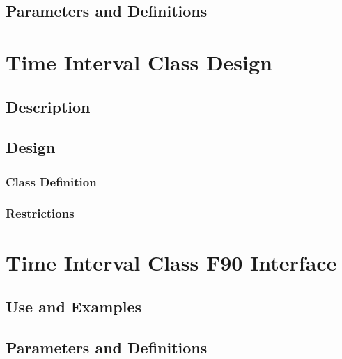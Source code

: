 \documentclass[]{article}
\begin{document}
\subsection{Parameters and Definitions}
%




\section{Time Interval Class Design}

\subsection{Description}


\subsection{Design}


\subsubsection{Class Definition}


\subsubsection{Restrictions}
%

\section{Time Interval Class F90 Interface}

\subsection{Use and Examples}


\subsection{Parameters and Definitions}
%
\end{document}
